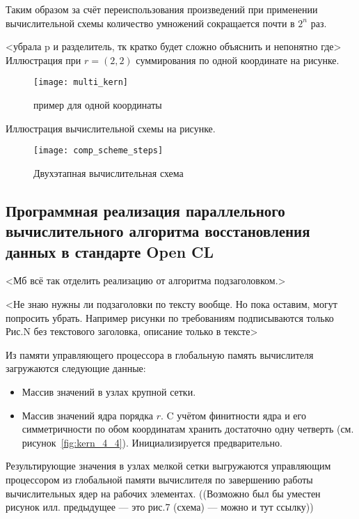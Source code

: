 Таким образом за счёт переиспользования произведений при применении вычислительной схемы
количество умножений сокращается почти в  $2^n$ раз.


<убрала p и разделитель, тк кратко будет сложно объяснить и непонятно где>
Иллюстрация при $r=(2,2)$ суммирования по одной координате на рисунке.
\begin{figure}[h!]
  \centering
  \texttt{[image: multi\_kern]} 
  \caption{пример для одной координаты}
  \label{fig:reg_net}
\end{figure}
\FloatBarrier


Иллюстрация вычислительной схемы на рисунке.
\begin{figure}[h!]
  \centering
  \texttt{[image: comp\_scheme\_steps]} 
  \caption{Двухэтапная вычислительная схема}
  \label{fig:reg_net}
\end{figure}
\FloatBarrier


\subsection*{Программная реализация параллельного вычислительного алгоритма
  восстановления данных в стандарте Open CL}

<Мб всё так отделить реализацию от алгоритма подзаголовком.>

<Не знаю нужны ли подзаголовки по тексту вообще.
Но пока оставим, могут попросить убрать.
Например рисунки по требованиям подписываются только Рис.N
без текстового заголовка, описание только в тексте>


Из памяти управляющего процессора
в глобальную память вычислителя 
загружаются следующие данные: 
\begin{itemize}
\item
  Массив значений в узлах крупной сетки. %
\item
  Массив значений ядра порядка $r$. %
  C учётом финитности ядра и его симметричности по
  обом координатам хранить достаточно одну четверть (см. рисунок~\ref{fig:kern_4_4}).
  Инициализируется предварительно.
\end{itemize}

Результирующие значения в узлах мелкой сетки выгружаются управляющим процессором
из глобальной памяти вычислителя по завершению работы вычислительных ядер на рабочих элементах.
((Возможно был бы уместен рисунок илл. предыдущее --- это рис.7 (схема) --- можно и тут ссылку))

